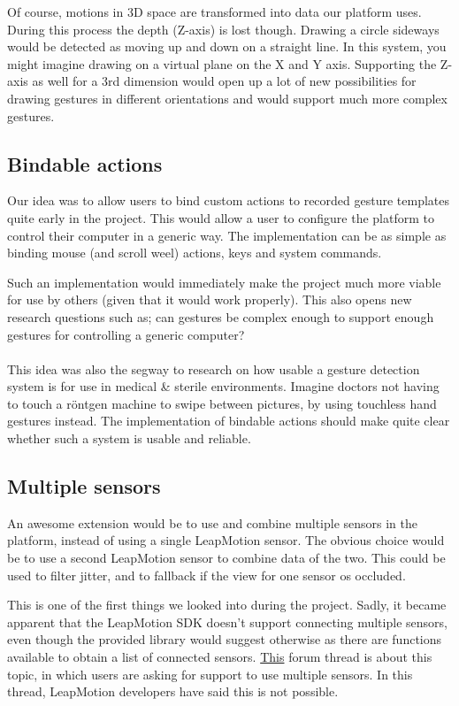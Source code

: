 \documentclass[a4paper]{article}
\begin{document}
  Of course, motions in 3D space are transformed into data our platform uses.
  During this process the depth (Z-axis) is lost though. Drawing a circle
  sideways would be detected as moving up and down on a straight line. In this
  system, you might imagine drawing on a virtual plane on the X and Y axis.
  Supporting the Z-axis as well for a 3rd dimension would open up a lot of new
  possibilities for drawing gestures in different orientations and would support
  much more complex gestures.

  \subsection{Bindable actions}
  Our idea was to allow users to bind custom actions to recorded gesture
  templates quite early in the project. This would allow a user to configure the
  platform to control their computer in a generic way. The implementation can be
  as simple as binding mouse (and scroll weel) actions, keys and system
  commands.

  Such an implementation would immediately make the project much more viable for
  use by others (given that it would work properly). This also opens new
  research questions such as; can gestures be complex enough to support enough
  gestures for controlling a generic computer?

  \paragraph{}
  This idea was also the segway to research on how usable a gesture detection
  system is for use in medical \& sterile environments. Imagine doctors not
  having to touch a röntgen machine to swipe between pictures, by using
  touchless hand gestures instead. The implementation of bindable actions
  should make quite clear whether such a system is usable and reliable.

  \subsection{Multiple sensors}
  An awesome extension would be to use and combine multiple sensors in the
  platform, instead of using a single LeapMotion sensor. The obvious choice
  would be to use a second LeapMotion sensor to combine data of the two. This
  could be used to filter jitter, and to fallback if the view for one sensor os
  occluded.

  This is one of the first things we looked into during the project. Sadly, it
  became apparent that the LeapMotion SDK doesn't support connecting multiple
  sensors, even though the provided library would suggest otherwise as there are
  functions available to obtain a list of connected sensors.
  \href{https://forums.leapmotion.com/t/multiple-leap-motion-support/770}{This}
  forum thread is about this topic, in which users are asking for support to use
  multiple sensors. In this thread, LeapMotion developers have said this is not
  possible.
\end{document}
